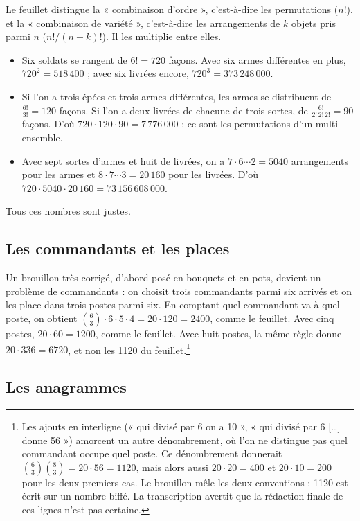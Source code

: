 \documentclass[11pt,a4paper]{article}
\begin{document}
Le feuillet distingue la « combinaison d'ordre », c'est-à-dire les permutations
(\(n!\)), et la « combinaison de variété », c'est-à-dire les arrangements de
\(k\) objets pris parmi \(n\) (\(n!/(n-k)!\)). Il les multiplie entre elles.
\begin{itemize}
  \item Six soldats se rangent de \(6!=720\) façons. Avec six armes différentes
    en plus, \(720^2=518\,400\) ; avec six livrées encore,
    \(720^3=373\,248\,000\).
  \item Si l'on a trois épées et trois armes différentes, les armes se
    distribuent de \(\frac{6!}{3!}=120\) façons. Si l'on a deux livrées de
    chacune de trois sortes, de \(\frac{6!}{2!\,2!\,2!}=90\) façons. D'où
    \(720\cdot120\cdot90=7\,776\,000\) : ce sont les permutations d'un
    multi-ensemble.
  \item Avec sept sortes d'armes et huit de livrées, on a \(7\cdot6\cdots2=5040\)
    arrangements pour les armes et \(8\cdot7\cdots3=20\,160\) pour les livrées.
    D'où \(720\cdot5040\cdot20\,160=73\,156\,608\,000\).
\end{itemize}
Tous ces nombres sont justes.

\subsection*{Les commandants et les places}

Un brouillon très corrigé, d'abord posé en bouquets et en pots, devient un
problème de commandants : on choisit trois commandants parmi six arrivés et on
les place dans trois postes parmi six. En comptant quel commandant va à quel
poste, on obtient \(\binom63\cdot6\cdot5\cdot4=20\cdot120=2400\), comme le
feuillet. Avec cinq postes, \(20\cdot60=1200\), comme le feuillet. Avec huit
postes, la même règle donne \(20\cdot336=6720\), et non les 1120 du
feuillet.\footnote{Les ajouts en interligne (« qui divisé par 6 on a 10 »,
« qui divisé par 6 […] donne 56 ») amorcent un autre dénombrement, où l'on ne
distingue pas quel commandant occupe quel poste. Ce dénombrement donnerait
\(\binom63\binom83=20\cdot56=1120\), mais alors aussi \(20\cdot20=400\) et
\(20\cdot10=200\) pour les deux premiers cas. Le brouillon mêle les deux
conventions ; 1120 est écrit sur un nombre biffé. La transcription avertit que
la rédaction finale de ces lignes n'est pas certaine.}

\subsection*{Les anagrammes}
\end{document}
